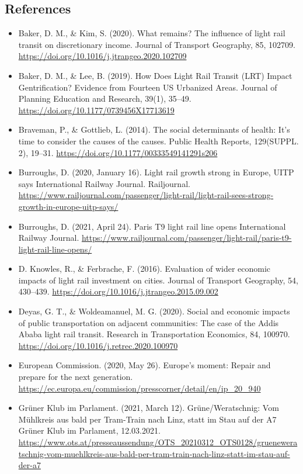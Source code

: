 \documentclass[
]{book}
\providecommand{\tightlist}{%
  \setlength{\itemsep}{0pt}\setlength{\parskip}{0pt}}
\begin{document}
\hypertarget{references-38}{%
\subsection*{References}\label{references-38}}

\begin{itemize}
\tightlist
\item
  Baker, D. M., \& Kim, S. (2020). What remains? The influence of light rail transit on discretionary income. Journal of Transport Geography, 85, 102709. \url{https://doi.org/10.1016/j.jtrangeo.2020.102709}
\item
  Baker, D. M., \& Lee, B. (2019). How Does Light Rail Transit (LRT) Impact Gentrification? Evidence from Fourteen US Urbanized Areas. Journal of Planning Education and Research, 39(1), 35--49. \url{https://doi.org/10.1177/0739456X17713619}
\item
  Braveman, P., \& Gottlieb, L. (2014). The social determinants of health: It's time to consider the causes of the causes. Public Health Reports, 129(SUPPL. 2), 19--31. \url{https://doi.org/10.1177/00333549141291s206}
\item
  Burroughs, D. (2020, January 16). Light rail growth strong in Europe, UITP says \textbar{} International Railway Journal. Railjournal. \url{https://www.railjournal.com/passenger/light-rail/light-rail-sees-strong-growth-in-europe-uitp-says/}
\item
  Burroughs, D. (2021, April 24). Paris T9 light rail line opens \textbar{} International Railway Journal. \url{https://www.railjournal.com/passenger/light-rail/paris-t9-light-rail-line-opens/}
\item
  D. Knowles, R., \& Ferbrache, F. (2016). Evaluation of wider economic impacts of light rail investment on cities. Journal of Transport Geography, 54, 430--439. \url{https://doi.org/10.1016/j.jtrangeo.2015.09.002}
\item
  Deyas, G. T., \& Woldeamanuel, M. G. (2020). Social and economic impacts of public transportation on adjacent communities: The case of the Addis Ababa light rail transit. Research in Transportation Economics, 84, 100970. \url{https://doi.org/10.1016/j.retrec.2020.100970}
\item
  European Commission. (2020, May 26). Europe's moment: Repair and prepare for the next generation. \url{https://ec.europa.eu/commission/presscorner/detail/en/ip_20_940}
\item
  Grüner Klub im Parlament. (2021, March 12). Grüne/Weratschnig: Vom Mühlkreis aus bald per Tram-Train nach Linz, statt im Stau auf der A7 \textbar{} Grüner Klub im Parlament, 12.03.2021. \url{https://www.ots.at/presseaussendung/OTS_20210312_OTS0128/grueneweratschnig-vom-muehlkreis-aus-bald-per-tram-train-nach-linz-statt-im-stau-auf-der-a7}

\end{itemize}
\end{document}
